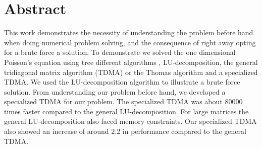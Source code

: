 \section*{Abstract}
This work demonstrates the necessity of understanding the problem
before hand when doing numerical problem solving, and the consequence of right
away opting for a brute force a solution. To demonstrate we solved the one
dimensional
Poisson's equation using tree different algorithms 
, LU-decomposition, the general tridiagonal matrix algorithm (TDMA) or the
Thomas algorithm \cite{tridia} and a specialized TDMA.
We used the LU-decomposition algorithm to illustrate a brute force solution.
From understanding our problem before hand, we developed a specialized TDMA for
our problem. The specialized TDMA was about 
80000 times faster compared to the general LU-decomposition. For large
matrices the general LU-decomposition also faced memory constraints. Our
specialized TDMA also showed an increase of around 2.2 in performance compared to the general TDMA.     